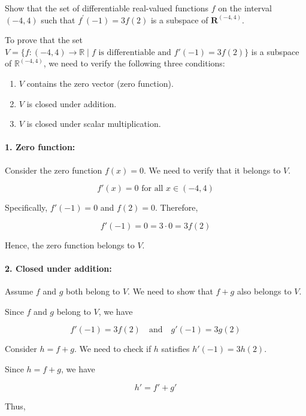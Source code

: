 \begin{exercise}
    Show that the set of differentiable real-valued functions $f$ on the interval $(-4,4)$ such that $f^{\prime}(-1)=3 f(2)$ is a subspace of $\mathbf{R}^{(-4,4)}$.
\end{exercise}
\begin{solution}
To prove that the set \( V = \{ f : (-4,4) \to \mathbb{R} \mid f \text{ is differentiable and } f'(-1) = 3f(2) \} \) is a subspace of \( \mathbb{R}^{(-4,4)} \), we need to verify the following three conditions:

\begin{enumerate}
    \item \( V \) contains the zero vector (zero function).
    \item \( V \) is closed under addition.
    \item \( V \) is closed under scalar multiplication.
\end{enumerate}

\paragraph{1. Zero function:}

Consider the zero function \( f(x) = 0 \). We need to verify that it belongs to \( V \).

\[
f'(x) = 0 \text{ for all } x \in (-4,4)
\]

Specifically, \( f'(-1) = 0 \) and \( f(2) = 0 \). Therefore,

\[
f'(-1) = 0 = 3 \cdot 0 = 3f(2)
\]

Hence, the zero function belongs to \( V \).

\paragraph{2. Closed under addition:}

Assume \( f \) and \( g \) both belong to \( V \). We need to show that \( f + g \) also belongs to \( V \).

Since \( f \) and \( g \) belong to \( V \), we have

\[
f'(-1) = 3f(2) \quad \text{and} \quad g'(-1) = 3g(2)
\]

Consider \( h = f + g \). We need to check if \( h \) satisfies \( h'(-1) = 3h(2) \).

Since \( h = f + g \), we have

\[
h' = f' + g'
\]

Thus,


\end{solution}
